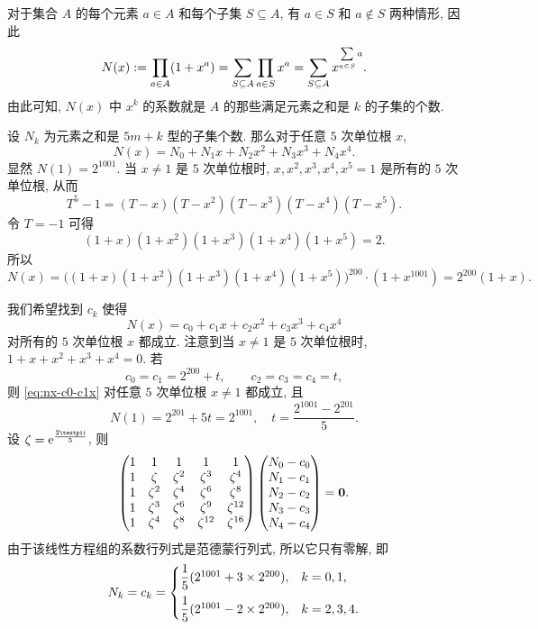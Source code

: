 \begin{solution}
  对于集合 $A$ 的每个元素 $a\in A$ 和每个子集 $S\subseteq A$, 有 $a\in S$ 和 $a\notin S$ 两种情形, 因此
  \[
    N(x):=\prod_{a\in A}(1+x^a)
    =\sum_{S\subseteq A}\prod_{a\in S}x^a
    =\sum_{S\subseteq A}x^{\sum\limits_{a\in S}a}.
  \]
  由此可知, $N(x)$ 中 $x^k$ 的系数就是 $A$ 的那些满足元素之和是 $k$ 的子集的个数.

  设 $N_k$ 为元素之和是 $5m+k$ 型的子集个数.
  那么对于任意 $5$ 次单位根 $x$,
  \[
    N(x)=N_0+N_1x+N_2x^2+N_3x^3+N_4x^4.
  \]
  显然 $N(1)=2^{1001}$.
  当 $x\neq 1$ 是 $5$ 次单位根时, $x,x^2,x^3,x^4,x^5=1$ 是所有的 $5$ 次单位根, 从而
  \[
    T^5-1=(T-x)(T-x^2)(T-x^3)(T-x^4)(T-x^5).
  \]
  令 $T=-1$ 可得
  \[
    (1+x)(1+x^2)(1+x^3)(1+x^4)(1+x^5)=2.
  \]
  所以
  \[
    N(x)=\bigl((1+x)(1+x^2)(1+x^3)(1+x^4)(1+x^5)\bigr)^{200}\cdot(1+x^{1001})
    =2^{200}(1+x).
  \]

  我们希望找到 $c_k$ 使得
  \begin{equation}
    \label{eq:nx-c0-c1x}
    N(x)=c_0+c_1x+c_2x^2+c_3x^3+c_4x^4
  \end{equation}
  对所有的 $5$ 次单位根 $x$ 都成立.
  注意到当 $x\neq 1$ 是 $5$ 次单位根时, $1+x+x^2+x^3+x^4=0$.
  若
  \[
    c_0=c_1=2^{200}+t,\qquad c_2=c_3=c_4=t,
  \]
  则 \ref{eq:nx-c0-c1x} 对任意 $5$ 次单位根 $x\neq 1$ 都成立, 且
  \[
    N(1)=2^{201}+5t=2^{1001},\quad
    t=\frac{2^{1001}-2^{201}}5.
  \]
  设 $\zeta=\ee^{\frac{2\cpi\ii}5}$, 则
  \[
    \begin{pmatrix}
      1&1&1&1&1\\
      1&\zeta&\zeta^2&\zeta^3&\zeta^4\\
      1&\zeta^2&\zeta^4&\zeta^6&\zeta^8\\
      1&\zeta^3&\zeta^6&\zeta^9&\zeta^{12}\\
      1&\zeta^4&\zeta^8&\zeta^{12}&\zeta^{16}
    \end{pmatrix}\begin{pmatrix}
      N_0-c_0\\
      N_1-c_1\\
      N_2-c_2\\
      N_3-c_3\\
      N_4-c_4
    \end{pmatrix}={\bf0}.
  \]
  由于该线性方程组的系数行列式是范德蒙行列式, 所以它只有零解, 即
  \[
    N_k=c_k=\begin{cases}
      \dfrac15(2^{1001}+3\times 2^{200}),&k=0,1,\\[2\itemsep]
      \dfrac15(2^{1001}-2\times 2^{200}),&k=2,3,4.
    \end{cases}
  \]
\end{solution}



